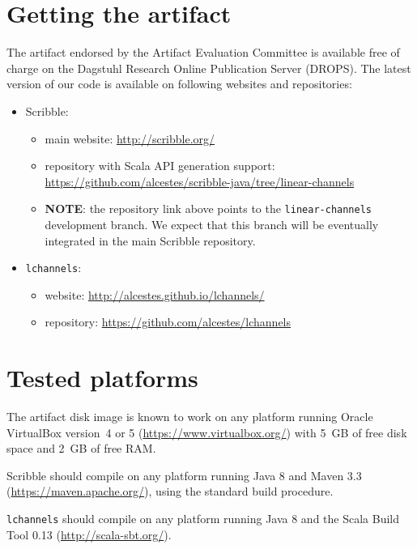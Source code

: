 \documentclass[a4paper,UKenglish]{darts}
\newenvironment{getting}{\section{Getting the artifact} The artifact 
endorsed by the Artifact Evaluation Committee is available free of 
charge on the Dagstuhl Research Online Publication Server (DROPS).}{}
\newenvironment{platforms}{\section{Tested platforms}}{}
\begin{document}
\begin{getting}
  The latest version of our code %
  is available on following websites and repositories:
  \begin{itemize}
  \item%
    Scribble:
    \begin{itemize}
    \item%
      main website: \url{http://scribble.org/}
    \item%
      repository with Scala API generation support: %
      \url{https://github.com/alcestes/scribble-java/tree/linear-channels}%
    \item%
      \textbf{NOTE}: the repository link above %
      points to the \texttt{linear-channels} development branch. %
      We expect that
      this branch %
      will be eventually integrated in the main Scribble repository.
    \end{itemize}
  \item%
    \texttt{lchannels}: %
    \begin{itemize}
    \item%
      website: \url{http://alcestes.github.io/lchannels/}%
    \item%
      repository: \url{https://github.com/alcestes/lchannels}%
    \end{itemize}
  \end{itemize}
\end{getting}

\begin{platforms}
  The artifact disk image %
  is known to work on any platform running Oracle VirtualBox
  version~4 or 5 (\url{https://www.virtualbox.org/}) %
  with 5~GB of free disk space %
  and 2~GB of free RAM.

  Scribble should compile on any platform running Java 8 and Maven 3.3
  (\url{https://maven.apache.org/}), using the standard build procedure.

  \texttt{lchannels} should compile on any platform running Java 8
  and the Scala Build Tool 0.13 %
  (\url{http://scala-sbt.org/}).
\end{platforms}
\end{document}
